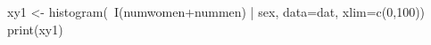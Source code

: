 \begin{Schunk}
\begin{Sinput}
 xy1 <-
 histogram(~I(numwomen+nummen)  | sex, data=dat, xlim=c(0,100))
 print(xy1)
\end{Sinput}
\end{Schunk}

